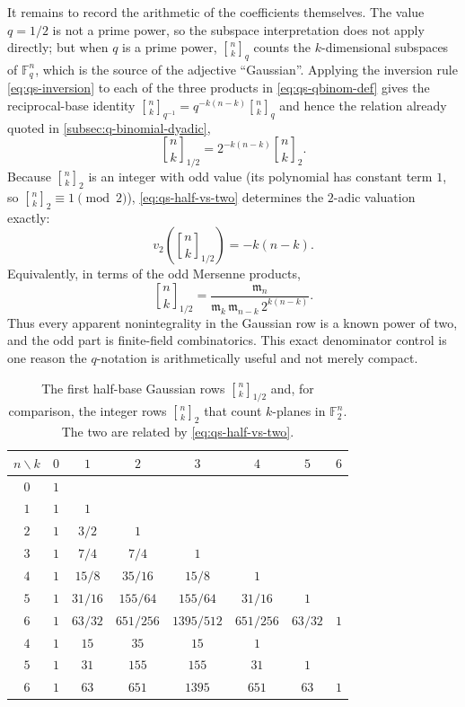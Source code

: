 \documentclass[11pt,oneside]{article}
\theoremstyle{definition}
\theoremstyle{remark}
\newcommand{\vtwo}{v_2}
\newcommand{\qbinom}[3]{\genfrac{[}{]}{0pt}{}{#1}{#2}_{#3}}
\begin{document}
It remains to record the arithmetic of the coefficients themselves.  The value $q=1/2$ is not
a prime power, so the subspace interpretation does not apply directly; but when $q$ is a
prime power, $\qbinom nkq$ counts the $k$-dimensional subspaces of $\mathbb F_q^n$, which is
the source of the adjective ``Gaussian''.  Applying the inversion rule
\eqref{eq:qs-inversion} to each of the three products in \eqref{eq:qs-qbinom-def} gives the
reciprocal-base identity $\qbinom nk{q^{-1}}=q^{-k(n-k)}\qbinom nkq$ and hence the relation
already quoted in \cref{subsec:q-binomial-dyadic},
\begin{equation}
 \qbinom nk{1/2}=2^{-k(n-k)}\qbinom nk2.                  \label{eq:qs-half-vs-two}
\end{equation}
Because $\qbinom nk2$ is an integer with odd value (its polynomial has constant term $1$, so
$\qbinom nk2\equiv1\pmod2$), \eqref{eq:qs-half-vs-two} determines the $2$-adic valuation
exactly:
\begin{equation}
 \vtwo\!\left(\qbinom nk{1/2}\right)=-k(n-k).             \label{eq:qs-half-valuation}
\end{equation}
Equivalently, in terms of the odd Mersenne products,
\begin{equation}
 \qbinom nk{1/2}
 =\frac{\mathfrak m_n}{\mathfrak m_k\,\mathfrak m_{n-k}\,2^{k(n-k)}}. \label{eq:qs-half-mersenne-binom}
\end{equation}
Thus every apparent nonintegrality in the Gaussian row is a known power of two, and the odd
part is finite-field combinatorics.  This exact denominator control is one reason the
$q$-notation is arithmetically useful and not merely compact.

\begin{table}[htbp]
\centering
\caption{The first half-base Gaussian rows $\qbinom nk{1/2}$ and, for comparison, the
integer rows $\qbinom nk2$ that count $k$-planes in $\mathbb F_2^n$.  The two are related by
\eqref{eq:qs-half-vs-two}.}
\label{tab:qs-gaussian-rows}
\begin{tabular}{@{}c*{7}{c}@{}}
\toprule
$n\backslash k$&$0$&$1$&$2$&$3$&$4$&$5$&$6$\\
\midrule
$0$&$1$\\
$1$&$1$&$1$\\
$2$&$1$&$3/2$&$1$\\
$3$&$1$&$7/4$&$7/4$&$1$\\
$4$&$1$&$15/8$&$35/16$&$15/8$&$1$\\
$5$&$1$&$31/16$&$155/64$&$155/64$&$31/16$&$1$\\
$6$&$1$&$63/32$&$651/256$&$1395/512$&$651/256$&$63/32$&$1$\\
\midrule
$4$&$1$&$15$&$35$&$15$&$1$\\
$5$&$1$&$31$&$155$&$155$&$31$&$1$\\
$6$&$1$&$63$&$651$&$1395$&$651$&$63$&$1$\\
\bottomrule
\end{tabular}
\end{table}
\end{document}
